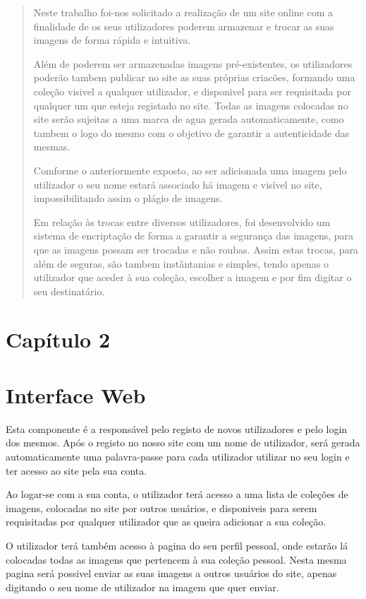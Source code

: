 \documentclass{report}
\begin{document}
\renewcommand{\abstractname}{OBJETIVOS DO PROJETO}
\begin{abstract}

Neste trabalho foi-nos solicitado a realização de um site online com a finalidade de os seus utilizadores poderem armazenar e trocar as suas imagens de forma rápida e intuitiva. 

Além de poderem ser armazenadas imagens pré-existentes, os utilizadores poderão tambem publicar no site as suas próprias criacões, formando uma coleção visivel a qualquer utilizador, e disponivel para ser requisitada por qualquer um que esteja registado no site.
Todas as imagens colocadas no site serão sujeitas a uma marca de agua gerada automaticamente, como tambem o logo do mesmo com o objetivo de garantir a autenticidade das mesmas.

Comforme o anteriormente exposto, ao ser adicionada uma imagem pelo utilizador o seu nome estará associado há imagem e visível no site, impossibilitando assim o plágio de imagens.

Em relação às trocas entre diversos utilizadores, foi desenvolvido um sistema de encriptação de forma a garantir a segurança das imagens, para que as imagens possam ser trocadas e não roubas. Assim estas trocas, para além de seguras, são tambem instântanias e simples, tendo apenas o utilizador que aceder à sua coleção, escolher a imagem e por fim digitar o seu destinatário.

\end{abstract}

\section{Capítulo 2}
\section{Interface Web}
Esta componente é a responsável pelo registo de novos utilizadores e pelo login dos mesmos. Após o registo no nosso site com um nome de utilizador, será gerada automaticamente uma palavra-passe para cada utilizador utilizar no seu login e ter acesso ao site pela sua conta.

Ao logar-se com a sua conta, o utilizador terá acesso a uma lista de coleções de imagens, colocadas no site por outros usuários, e disponiveis para serem requisitadas por qualquer utilizador que as queira adicionar a sua coleção. 

O utilizador terá também acesso à pagina do seu perfil pessoal, onde estarão lá colocadas todas as imagens que pertencem à sua coleção pessoal. Nesta mesma pagina será possivel enviar as suas imagens a outros usuários do site, apenas digitando o seu nome de utilizador na imagem que quer enviar. 
\end{document}
